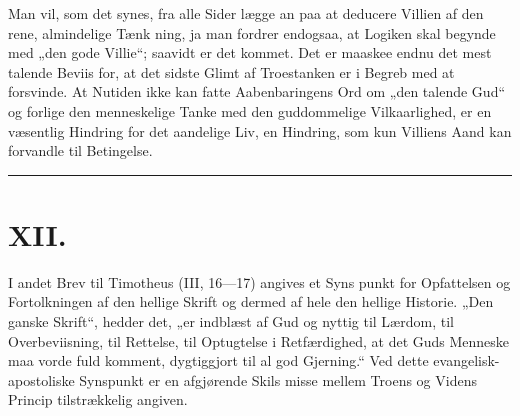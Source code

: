 \documentclass[12pt]{book}
\newcommand{\opage}[1]{\marginnote{\footnotesize\textit{[#1]}}}
\begin{document}
Man vil, som det synes, fra alle Sider lægge an
paa at deducere Villien af den rene, almindelige Tænk\-%
ning, ja man fordrer endogsaa, at Logiken skal begynde
med „den gode Villie“; saavidt er det kommet. Det er
maaskee endnu det mest talende Beviis for, at det sidste
Glimt af Troestanken er i Begreb med at forsvinde. At
Nutiden ikke kan fatte Aabenbaringens Ord om „den
talende Gud“ og forlige den menneskelige Tanke med
den guddommelige Vilkaarlighed, er en væsentlig Hindring
for det aandelige Liv, en Hindring, som kun Villiens
Aand kan forvandle til Betingelse.

\begin{center}\rule{3cm}{0.4pt}\end{center}

\chapter*{XII.}
\label{ch:xii}
\opage{194}\setcounter{footnote}{0}%
I andet Brev til Timotheus (III, 16---17) angives et Syns\-%
punkt for Opfattelsen og Fortolkningen af den hellige
Skrift og dermed af hele den hellige Historie. „Den
ganske Skrift“, hedder det, „er indblæst af Gud og nyttig
til Lærdom, til Overbeviisning, til Rettelse, til Optugtelse
i Retfærdighed, at det Guds Menneske maa vorde fuld\-%
komment, dygtiggjort til al god Gjerning.“ Ved dette
evangelisk-apostoliske Synspunkt er en afgjørende Skils\-%
misse mellem Troens og Videns Princip tilstrækkelig
angiven.
\end{document}

